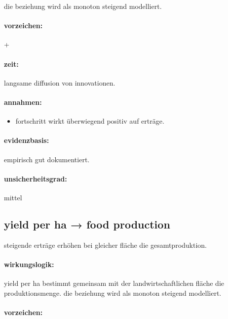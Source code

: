 \documentclass[11pt, a4paper, oneside]{scrartcl}
\begin{document}
die beziehung wird als monoton steigend modelliert.

\paragraph{vorzeichen:}

+

\paragraph{zeit:} 

langsame diffusion von innovationen.

\paragraph{annahmen:}
\begin{itemize}
\item fortschritt wirkt überwiegend positiv auf erträge.
\end{itemize}

\paragraph{evidenzbasis:}

empirisch gut dokumentiert.

\paragraph{unsicherheitsgrad:} 

mittel

\subsection{yield per ha → food production}
steigende erträge erhöhen bei gleicher fläche die gesamtproduktion.


\paragraph{wirkungslogik:}

yield per ha bestimmt gemeinsam mit der landwirtschaftlichen fläche die produktionsmenge.
die beziehung wird als monoton steigend modelliert.

\paragraph{vorzeichen:}
\end{document}

